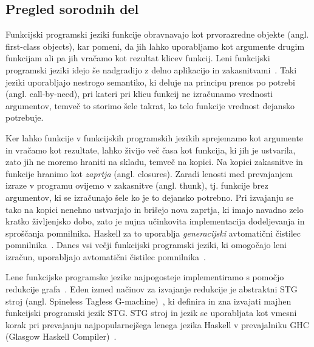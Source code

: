 \documentclass[a4paper, 12pt]{article}
\begin{document}
\subsection{Pregled sorodnih del}

Funkcijski programski jeziki funkcije obravnavajo kot prvorazredne objekte (angl. first-class objects), kar pomeni, da jih lahko uporabljamo kot argumente drugim funkcijam ali pa jih vračamo kot rezultat klicev funkcij. Leni funkcijski programski jeziki idejo še nadgradijo z delno aplikacijo in zakasnitvami~\cite{10.1145/72551.72554}. Taki jeziki uporabljajo nestrogo semantiko, ki deluje na principu prenos po potrebi (angl. call-by-need), pri kateri pri klicu funkcij ne izračunamo vrednosti argumentov, temveč to storimo šele takrat, ko telo funkcije vrednost dejansko potrebuje. 

Ker lahko funkcije v funkcijskih programskih jezikih sprejemamo kot argumente in vračamo kot rezultate, lahko živijo več časa kot funkcija, ki jih je ustvarila, zato jih ne moremo hraniti na skladu, temveč na kopici. Na kopici zakasnitve in funkcije hranimo kot \textit{zaprtja} (angl. closures). Zaradi lenosti med prevajanjem izraze v programu ovijemo v zakasnitve (angl. thunk), tj. funkcije brez argumentov, ki se izračunajo šele ko je to dejansko potrebno. Pri izvajanju se tako na kopici nenehno ustvarjajo in brišejo nova zaprtja, ki imajo navadno zelo kratko življenjsko dobo, zato je nujna učinkovita implementacija dodeljevanja in sproščanja pomnilnika. Haskell za to uporablja \textit{generacijski} avtomatični čistilec pomnilnika~\cite{sansom1993generational, GHC}. Danes vsi večji funkcijski programski jeziki, ki omogočajo leni izračun, uporabljajo avtomatični čistilec pomnilnika~\cite{turner1985miranda, czaplicki2012elm, brus1987clean, syme2017the, sperber2009revised6}.

Lene funkcijske programske jezike najpogosteje implementiramo s pomočjo redukcije gra\-fa~\cite{peyton1987implementation}. Eden izmed načinov za izvajanje redukcije je abstraktni STG stroj (angl. Spineless Tagless G-machine)~\cite{jones1992implementing}, ki definira in zna izvajati majhen funkcijski programski jezik STG. STG stroj in jezik se uporabljata kot vmesni korak pri prevajanju najpopularnejšega lenega jezika Haskell v prevajalniku GHC (Glasgow Haskell Compiler)~\cite{GHC}.

\end{document}
